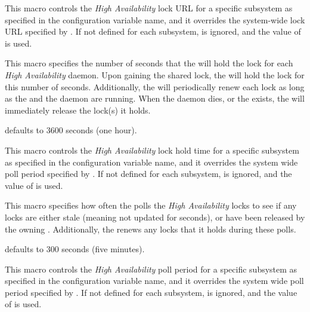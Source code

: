 \begin{description}
\label{param:HASubsysLockURL}
\item[\Macro{HA\_<SUBSYS>\_LOCK\_URL}]
  This macro controls the 
  \emph{High Availability} lock URL for a specific subsystem
  as specified in the configuration variable name,
  and it overrides the system-wide lock URL specified by
  .  If not defined for each subsystem,
   is ignored, and the value of
   is used.

\label{param:HALockHoldTime}
\item[\Macro{HA\_LOCK\_HOLD\_TIME}]
  This macro
  specifies the number of seconds that the  will hold the
  lock for each \emph{High Availability} daemon.
  Upon gaining the shared lock,
  the  will hold the lock for this number of seconds.
  Additionally, the  will periodically renew
  each lock as long as the  and the daemon are running.
  When the daemon dies, or the  exists, the
   will immediately release the lock(s) it holds.

   defaults to 3600 seconds (one hour).

\label{param:HASubsysLockHoldTime}
\item[\Macro{HA\_<SUBSYS>\_LOCK\_HOLD\_TIME}]
  This macro controls the \emph{High Availability} lock
  hold time for a specific subsystem
  as specified in the configuration variable name,
  and it overrides the system wide poll period specified by
  .
  If not defined for each subsystem,
   is ignored,
  and the value of  is used.

\label{param:HALockPollPeriod} 
\item[\Macro{HA\_POLL\_PERIOD}]
  This macro specifies how often the  polls the
  \emph{High Availability} locks to see if any locks are either stale
  (meaning not updated for  seconds),
  or have been released by the owning .
  Additionally, the  renews any locks that it
  holds during these polls.

   defaults to 300 seconds (five minutes).

\label{param:HALockPollSubsysPeriod}
\item[\Macro{HA\_<SUBSYS>\_POLL\_PERIOD}]
  This macro controls the \emph{High Availability} poll period
  for a specific subsystem
  as specified in the configuration variable name,
  and it overrides the system wide poll period specified by
  .
  If not defined for each subsystem,
   is ignored,
  and the value of  is used.


\end{description}
